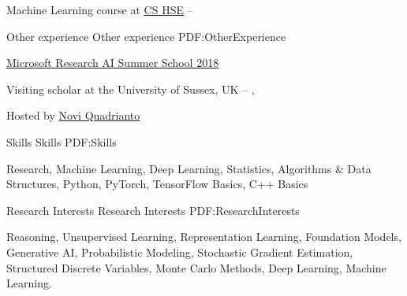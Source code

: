 \documentclass[letterpaper,MMMyyyy,nonstopmode]{simpleresumecv}
\begin{document}
\begin{Body}
\Entry
Machine Learning course at \href{https://cs.hse.ru/en/}{CS HSE}
\hfill
{} --
\Gap


\Section
{Other experience}
{Other experience}
{PDF:OtherExperience}

\Entry
\href{https://www.microsoft.com/en-us/research/event/ai-summer-school-2018/}{Microsoft Research AI Summer School 2018}
\hfill
{}
\Gap

\Entry
Visiting scholar at the University of Sussex, UK
\hfill
{} --
, 
\begin{Detail}
Hosted by \href{http://www.sussex.ac.uk/profiles/335583}{Novi Quadrianto} \hfil
\end{Detail}


\Section
{Skills}
{Skills}
{PDF:Skills}

\Entry Research, Machine Learning, Deep Learning, Statistics, Algorithms \& Data Structures, Python, PyTorch, TensorFlow Basics, C++ Basics



\Section
{Research Interests}
{Research Interests}
{PDF:ResearchInterests}

\Entry Reasoning, Unsupervised Learning, Representation Learning, Foundation Models, Generative AI, Probabilistic Modeling, Stochastic Gradient Estimation, Structured Discrete Variables, Monte Carlo Methods, Deep Learning, Machine Learning.


\iffalse

\Section
{Languages}
{Languages}
{PDF:Languages}

\BulletItem
Russian: Mother tongue.

\Gap
\BulletItem
English: Fluent


\Section
{Skills}
{Skills}
{PDF:Skills}

\BulletItem
Machine Learning, Deep Learning, Probabilistic Machine Learning

\BulletItem
Python, Pytorch, Feel free with Linux
\fi


\end{Body}
\end{document}

